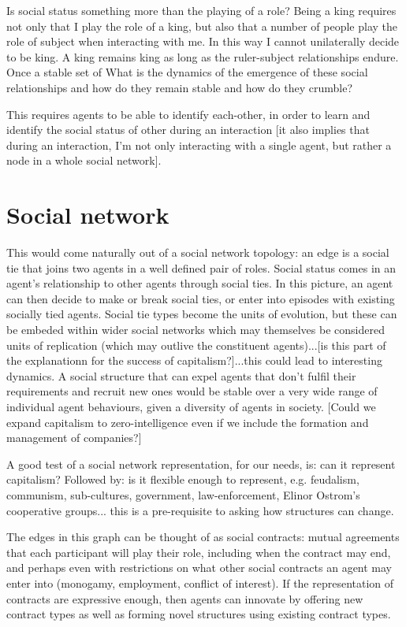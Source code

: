 \documentclass[a4paper]{article}
\begin{document}
Is social status something more than the playing of a role? Being a king requires not only that I play the role of a king, but also that a number of people play the role of subject when interacting with me. In this way I cannot unilaterally decide to be king. A king remains king as long as the ruler-subject relationships endure. Once a stable set of   What is the dynamics of the emergence of these social relationships and how do they remain stable and how do they crumble? 

This requires agents to be able to identify each-other, in order to learn and identify the social status of other during an interaction [it also implies that during an interaction, I'm not only interacting with a single agent, but rather a node in a whole social network].

\section{Social network}

This would come naturally out of a social network topology: an edge is a social tie that joins two agents in a well defined pair of roles. Social status comes in an agent's relationship to other agents through social ties. In this picture, an agent can then decide to make or break social ties, or enter into episodes with existing socially tied agents. Social tie types become the units of evolution, but these can be embeded within wider social networks which may themselves be considered units of replication (which may outlive the constituent agents)...[is this part of the explanationn for the success of capitalism?]...this could lead to interesting dynamics. A social structure that can expel agents that don't fulfil their requirements and recruit new ones would be stable over a very wide range of individual agent behaviours, given a diversity of agents in society. [Could we expand capitalism to zero-intelligence even if we include the formation and management of companies?]

A good test of a social network representation, for our needs, is: can it represent capitalism? Followed by: is it flexible enough to represent, e.g. feudalism, communism, sub-cultures, government, law-enforcement, Elinor Ostrom's cooperative groups... this is a pre-requisite to asking how structures can change.  

The edges in this graph can be thought of as social contracts: mutual agreements that each participant will play their role, including when the contract may end, and perhaps even with restrictions on what other social contracts an agent may enter into (monogamy, employment, conflict of interest). If the representation of contracts are expressive enough, then agents can innovate by offering new contract types as well as forming novel structures using existing contract types. 
\end{document}
